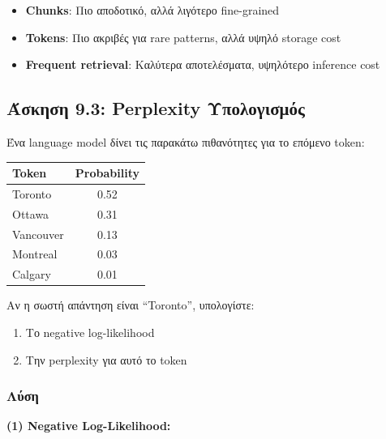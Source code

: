 \begin{warningbox}
\begin{itemize}
    \item \textbf{Chunks}: Πιο αποδοτικό, αλλά λιγότερο fine-grained
    \item \textbf{Tokens}: Πιο ακριβές για rare patterns, αλλά υψηλό storage cost
    \item \textbf{Frequent retrieval}: Καλύτερα αποτελέσματα, υψηλότερο inference cost
\end{itemize}
\end{warningbox}

\subsection{Άσκηση 9.3: Perplexity Υπολογισμός}

\begin{formulabox}[Εκφώνηση]
Ένα language model δίνει τις παρακάτω πιθανότητες για το επόμενο token:

\begin{center}
\begin{tabular}{lc}
\toprule
\textbf{Token} & \textbf{Probability} \\
\midrule
Toronto & 0.52 \\
Ottawa & 0.31 \\
Vancouver & 0.13 \\
Montreal & 0.03 \\
Calgary & 0.01 \\
\bottomrule
\end{tabular}
\end{center}

Αν η σωστή απάντηση είναι ``Toronto'', υπολογίστε:
\begin{enumerate}
    \item Το negative log-likelihood
    \item Την perplexity για αυτό το token
\end{enumerate}
\end{formulabox}

\subsubsection*{Λύση}

\textbf{(1) Negative Log-Likelihood:}

